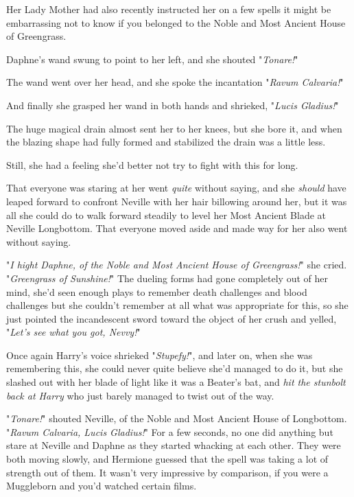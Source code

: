 Her Lady Mother had also recently instructed her on a few spells it might be
embarrassing not to know if you belonged to the Noble and Most Ancient House of
Greengrass.

Daphne's wand swung to point to her left, and she shouted "\emph{Tonare!}"

The wand went over her head, and she spoke the incantation "\emph{Ravum
Calvaria!}"

And finally she grasped her wand in both hands and shrieked, "\emph{Lucis
Gladius!}"

The huge magical drain almost sent her to her knees, but she bore it, and when
the blazing shape had fully formed and stabilized the drain was a little less.

Still, she had a feeling she'd better not try to fight with this for long.

That everyone was staring at her went \emph{quite} without saying, and she
\emph{should} have leaped forward to confront Neville with her hair billowing
around her, but it was all she could do to walk forward steadily to level her
Most Ancient Blade at Neville Longbottom. That everyone moved aside and made
way for her also went without saying.

"\emph{I hight Daphne, of the Noble and Most Ancient House of Greengrass!}" she
cried. "\emph{Greengrass of Sunshine!}" The dueling forms had gone completely
out of her mind, she'd seen enough plays to remember death challenges and blood
challenges but she couldn't remember at all what was appropriate for this, so
she just pointed the incandescent sword toward the object of her crush and
yelled, "\emph{Let's see what you got, Nevvy!}"

Once again Harry's voice shrieked "\emph{Stupefy!}", and later on, when she was
remembering this, she could never quite believe she'd managed to do it, but she
slashed out with her blade of light like it was a Beater's bat, and \emph{hit
the stunbolt back at Harry} who just barely managed to twist out of the way.

"\emph{Tonare!}" shouted Neville, of the Noble and Most Ancient House of
Longbottom. "\emph{Ravum Calvaria, Lucis Gladius!}"
\later
For a few seconds, no one did anything but stare at Neville and Daphne as they
started whacking at each other. They were both moving slowly, and Hermione
guessed that the spell was taking a lot of strength out of them. It wasn't very
impressive by comparison, if you were a Muggleborn and you'd watched certain
films.


